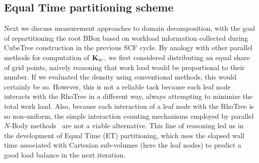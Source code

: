 \commentoutA{\documentclass[prl,aps,twocolumn,showpacs,twocolumngrid,superbib]{revtex4}}
\newcommand{\Kxc}{{\bf K}_{\mathrm{xc}}}
\begin{document}
\subsection{Equal Time partitioning scheme}
\label{subsec:Equal Time}

Next we discuss measurement approaches to domain decomposition, with
the goal of repartitioning the root BBox based on workload information
collected during CubeTree construction in the previous SCF cycle.  
By analogy with other parallel methods for computation of $\Kxc$,
we first considered distributing an equal share of grid points, naively 
reasoning that work load would be proportional to their number. 
If we evaluated the density using conventional methods, this would 
certainly be so.  However, this is not a reliable tack because 
each leaf node interacts with the RhoTree in a different way, always attempting to 
minimize the total work load.  Also, because each interaction of a leaf 
node with the RhoTree is so non-uniform, the simple 
interaction counting mechanisms employed by parallel $N$-Body methods~\cite{JPilkington96,warren:92_article,Grama94_article,Warren95b,Singh93,Singh_95v27,Grama_98v24}
are not a viable alternative.  This line of reasoning led us in the
development of Equal Time (ET) partitioning,  which uses the elapsed
wall time associated with Cartesian sub-volumes (here the leaf nodes)
to predict a good load balance in the next iteration.
\end{document}
